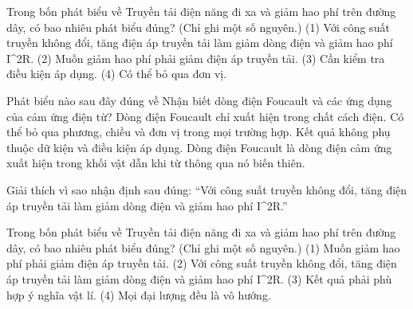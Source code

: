 \begin{ex}
Trong bốn phát biểu về Truyền tải điện năng đi xa và giảm hao phí trên đường dây, có bao nhiêu phát biểu đúng? (Chỉ ghi một số nguyên.) (1) Với công suất truyền không đổi, tăng điện áp truyền tải làm giảm dòng điện và giảm hao phí I^2R. (2) Muốn giảm hao phí phải giảm điện áp truyền tải. (3) Cần kiểm tra điều kiện áp dụng. (4) Có thể bỏ qua đơn vị.
\end{ex}

\begin{ex}
Phát biểu nào sau đây đúng về Nhận biết dòng điện Foucault và các ứng dụng của cảm ứng điện từ?
\choice
{Dòng điện Foucault chỉ xuất hiện trong chất cách điện.}
{Có thể bỏ qua phương, chiều và đơn vị trong mọi trường hợp.}
{Kết quả không phụ thuộc dữ kiện và điều kiện áp dụng.}
{\True Dòng điện Foucault là dòng điện cảm ứng xuất hiện trong khối vật dẫn khi từ thông qua nó biến thiên.}
\end{ex}

\begin{bt}
Giải thích vì sao nhận định sau đúng: “Với công suất truyền không đổi, tăng điện áp truyền tải làm giảm dòng điện và giảm hao phí I^2R.”
\end{bt}

\begin{ex}
Trong bốn phát biểu về Truyền tải điện năng đi xa và giảm hao phí trên đường dây, có bao nhiêu phát biểu đúng? (Chỉ ghi một số nguyên.) (1) Muốn giảm hao phí phải giảm điện áp truyền tải. (2) Với công suất truyền không đổi, tăng điện áp truyền tải làm giảm dòng điện và giảm hao phí I^2R. (3) Kết quả phải phù hợp ý nghĩa vật lí. (4) Mọi đại lượng đều là vô hướng.
\end{ex}

